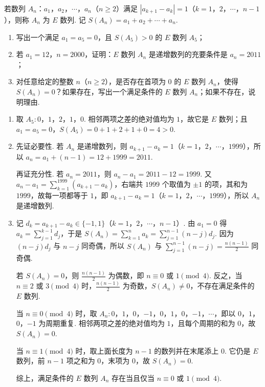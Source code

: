 \begin{problem}
若数列 \(A_n\)：\(a_1\)，\(a_2\)，\(\cdots\)，\(a_n\)（\(n \geqslant 2\)）满足 \(\left|a_{k+1} - a_k\right| = 1\)（\(k = 1\)，\(2\)，\(\cdots\)，\(n - 1\)），则称 \(A_n\) 为 \(E\) 数列. 记 \(S(A_n) = a_1 + a_2 + \cdots + a_n\).

\begin{enumerate}
\item 写出一个满足 \(a_1 = a_5 = 0\)，且 \(S(A_5) > 0\) 的 \(E\) 数列 \(A_5\)；
\item 若 \(a_1 = 12\)，\(n = 2000\)，证明：\(E\) 数列 \(A_n\) 是递增数列的充要条件是 \(a_n = 2011\)；
\item 对任意给定的整数 \(n\)（\(n \geqslant 2\)），是否存在首项为 \(0\) 的 \(E\) 数列 \(A_n\)，使得 \(S(A_n) = 0\)？如果存在，写出一个满足条件的 \(E\) 数列 \(A_n\)；如果不存在，说明理由.
\end{enumerate}

\begin{solution}
\begin{enumerate}
\item 取 \(A_5: 0\)，\(1\)，\(2\)，\(1\)，\(0\). 相邻两项之差的绝对值均为 \(1\)，故它是 \(E\) 数列；且 \(a_1=a_5=0\)，\(S(A_5)=0+1+2+1+0=4>0\).
\item 先证必要性. 若 \(A_n\) 是递增数列，则 \(a_{k+1}-a_k=1\)（\(k=1\)，\(2\)，\(\cdots\)，\(1999\)），所以 \(a_n=a_1+(n-1)=12+1999=2011\).

再证充分性. 若 \(a_n=2011\)，则 \(a_n-a_1=2011-12=1999\). 又 \(a_n-a_1=\sum_{k=1}^{1999}\left(a_{k+1}-a_k\right)\)，右端共 \(1999\) 个取值为 \(\pm1\) 的项，其和为 \(1999\)，故每一项都等于 \(1\)，即 \(a_{k+1}-a_k=1\)（\(k=1\)，\(2\)，\(\cdots\)，\(1999\)），所以 \(A_n\) 是递增数列.
\item 记 \(d_k=a_{k+1}-a_k\in\{-1,1\}\)（\(k=1\)，\(2\)，\(\cdots\)，\(n-1\)）. 由 \(a_1=0\) 得 \(a_k=\sum_{j=1}^{k-1}d_j\)，于是 \(S(A_n)=\sum_{k=1}^{n}a_k=\sum_{j=1}^{n-1}(n-j)d_j\). 因为 \((n-j)d_j\) 与 \(n-j\) 同奇偶，所以 \(S(A_n)\) 与 \(\sum_{j=1}^{n-1}(n-j)=\frac{n(n-1)}{2}\) 同奇偶.

若 \(S(A_n)=0\)，则 \(\frac{n(n-1)}{2}\) 为偶数，即 \(n\equiv0\) 或 \(1\pmod4\). 反之，当 \(n\equiv2\) 或 \(3\pmod4\) 时，\(\frac{n(n-1)}{2}\) 为奇数，\(S(A_n)\ne0\)，不存在满足条件的 \(E\) 数列.

当 \(n\equiv0\pmod4\) 时，取 \(A_n: 0\)，\(1\)，\(0\)，\(-1\)，\(0\)，\(1\)，\(0\)，\(-1\)，\(\cdots\)，即以 \(0\)，\(1\)，\(0\)，\(-1\) 为周期重复. 相邻两项之差的绝对值均为 \(1\)，且每个周期的和为 \(0\)，故 \(S(A_n)=0\).

当 \(n\equiv1\pmod4\) 时，取上面长度为 \(n-1\) 的数列并在末尾添上 \(0\). 它仍是 \(E\) 数列，前 \(n-1\) 项之和为 \(0\)，末项为 \(0\)，故 \(S(A_n)=0\).

综上，满足条件的 \(E\) 数列 \(A_n\) 存在当且仅当 \(n\equiv0\) 或 \(1\pmod4\).
\end{enumerate}
\end{solution}
\end{problem}
